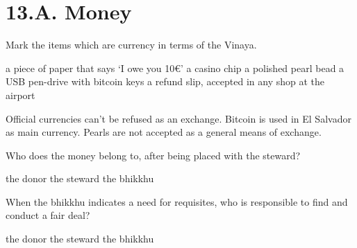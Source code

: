 \chapter{13.A. Money}
\renewcommand*{\theChapterTitle}{13.A. Money}

\begin{exam}{\autoExamName}

  \begin{problem}

    Mark the items which are currency in terms of the Vinaya.

    \bigskip

    \begin{manswers}{1}
      \bChoices
       a piece of paper that says `I owe you 10€'\eAns
       a casino chip\eAns
       a polished pearl bead\eAns
       a USB pen-drive with bitcoin keys\eAns
       a refund slip, accepted in any shop at the airport\eAns
      \eChoices
    \end{manswers}

    \begin{solution}
      Official currencies can't be refused as an exchange. Bitcoin is used in El
      Salvador as main currency. Pearls are not accepted as a general means of
      exchange.
    \end{solution}
    
  \end{problem}

  \problemDivide

  \begin{problem*}

    \begin{parts}

    \item Who does the money belong to, after being placed with the steward?

      \bigskip

      \begin{answers}{3}
        \bChoices
         the donor\eAns
         the steward\eAns
         the bhikkhu\eAns
        \eChoices
      \end{answers}

      \bigskip

    \item When the bhikkhu indicates a need for requisites, who is responsible to find and conduct a fair deal?

      \bigskip

      \begin{answers}{3}
        \bChoices
         the donor\eAns
         the steward\eAns
         the bhikkhu\eAns
        \eChoices
      \end{answers}


\end{parts}
\end{problem*}
\end{exam}
